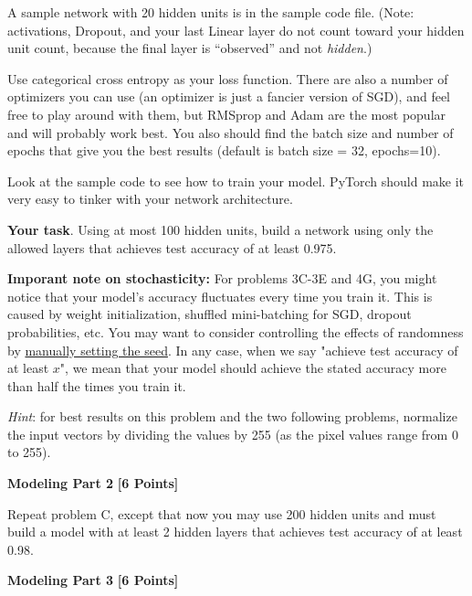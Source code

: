 A sample network with 20 hidden units is in the sample code file. (Note: activations, Dropout, and your last Linear layer do not count toward your hidden unit count, because the final layer is ``observed'' and not \emph{hidden}.)

Use categorical cross entropy as your loss function. There are also a number of optimizers  you can use (an optimizer is just a fancier version of SGD), and feel free to play around with them, but RMSprop and Adam are the most popular and will probably work best. You also should find the batch size and number of epochs that give you the best results (default is batch size = 32, epochs=10).

Look at the sample code to see how to train your model. PyTorch should make it very easy to tinker with your network architecture.

\textbf{Your task}. Using at most 100 hidden units, build a network using only the allowed layers that achieves test accuracy of at least 0.975.

\textbf{Imporant note on stochasticity: } For problems 3C-3E and 4G, you might notice that your model's accuracy fluctuates every time you train it. This is caused by weight initialization, shuffled mini-batching for SGD, dropout probabilities, etc. You may want to consider controlling the effects of randomness by \href{https://pytorch.org/docs/stable/generated/torch.manual_seed.html}{manually setting the seed}. In any case, when we say "achieve test accuracy of at least $x$", we mean that your model should achieve the stated accuracy more than half the times you train it.

\textit{Hint}: for best results on this problem and the two following problems, normalize the input vectors by dividing the values by 255 (as the pixel values range from 0 to 255).

\begin{solution}
  
\end{solution}


 \problem \textbf{Modeling Part 2} \textbf{[6 Points]}

 Repeat problem C, except that now you may use 200 hidden units and must build a model with at least 2 hidden layers that achieves test accuracy of at least 0.98.

 \begin{solution}

\end{solution}

  \problem \textbf{Modeling Part 3} \textbf{[6 Points]}


